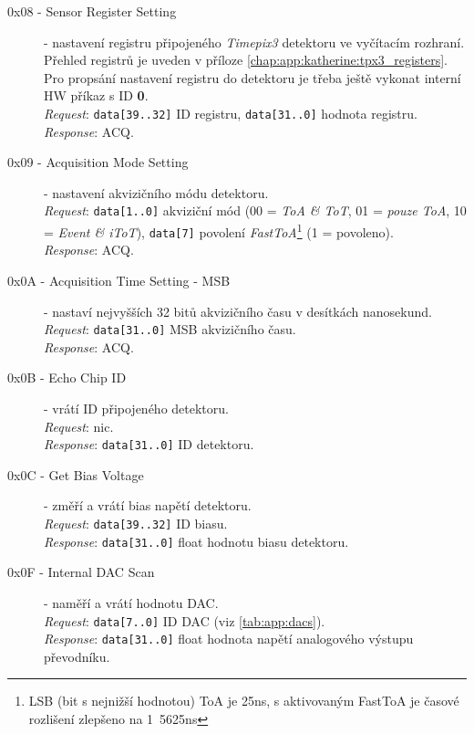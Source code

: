 \begin{description}
    \item[0x08 - Sensor Register Setting] - nastavení registru připojeného \textit{Timepix3} detektoru ve vyčítacím rozhraní. Přehled registrů je uveden v příloze \ref{chap:app:katherine:tpx3_registers}. Pro propsání nastavení registru do detektoru je třeba ještě vykonat interní HW příkaz s ID \textbf{0}.
    \\\textit{Request}: \texttt{data[39..32]} ID registru, \texttt{data[31..0]} hodnota registru.
    \\\textit{Response}: ACQ.
    
    \item[0x09 - Acquisition Mode Setting] - nastavení akvizičního módu detektoru.
    \\\textit{Request}: \texttt{data[1..0]} akviziční mód (00 = \textit{ToA \& ToT}, 01 = \textit{pouze ToA}, 10 = \textit{Event \& iToT}), \texttt{data[7]} povolení \textit{FastToA}\footnote{LSB (bit s nejnižší hodnotou) ToA je \unit{25}{ns}, s aktivovaným FastToA je časové rozlišení zlepšeno na \unit{1.5625}{ns}} (1 = povoleno).
    \\\textit{Response}: ACQ.

    \item[0x0A - Acquisition Time Setting - MSB] - nastaví nejvyšších 32 bitů akvizičního času v desítkách nanosekund.
    \\\textit{Request}: \texttt{data[31..0]} MSB akvizičního času.
    \\\textit{Response}: ACQ.

    \item[0x0B - Echo Chip ID] - vrátí ID připojeného detektoru.
    \\\textit{Request}: nic.
    \\\textit{Response}: \texttt{data[31..0]} ID detektoru.

    \item[0x0C - Get Bias Voltage] - změří a vrátí bias napětí detektoru.
    \\\textit{Request}: \texttt{data[39..32]} ID biasu.
    \\\textit{Response}: \texttt{data[31..0]} float hodnotu biasu detektoru.


    \item[0x0F - Internal DAC Scan] - naměří a vrátí hodnotu DAC.
    \\\textit{Request}: \texttt{data[7..0]} ID DAC (viz \ref{tab:app:dacs}).
    \\\textit{Response}: \texttt{data[31..0]} float hodnota napětí analogového výstupu převodníku.


\end{description}
